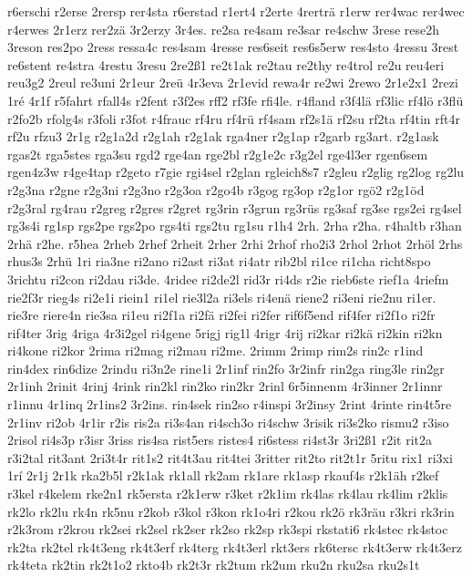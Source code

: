 {r6erschi
r2erse
2rersp
rer4sta
r6erstad
r1ert4
r2erte
4rerträ
r1erw
rer4wac
rer4wec
r4erwes
2r1erz
rer2zä
3r2erzy
3r4es.
re2sa
re4sam
re3sar
re4schw
3rese
rese2h
3reson
res2po
2ress
ressa4c
res4sam
4resse
res6seit
res6s5erw
res4sto
4ressu
3rest
re6stent
re4stra
4restu
3resu
2re2ß1
re2t1ak
re2tau
re2thy
re4trol
re2u
reu4eri
reu3g2
2reul
re3uni
2r1eur
2reü
4r3eva
2r1evid
rewa4r
re2wi
2rewo
2r1e2x1
2rezi
1ré
4r1f
r5fahrt
rfall4s
r2fent
r3f2es
rff2
rf3fe
rfi4le.
r4fland
r3f4lä
rf3lic
rf4lö
r3flü
r2fo2b
rfolg4s
r3foli
r3fot
r4frauc
rf4ru
rf4rü
rf4sam
rf2s1ä
rf2su
rf2ta
rf4tin
rft4r
rf2u
rfzu3
2r1g
r2g1a2d
r2g1ah
r2g1ak
rga4ner
r2g1ap
r2garb
rg3art.
r2g1ask
rgas2t
rga5stes
rga3su
rgd2
rge4an
rge2bl
r2g1e2c
r3g2el
rge4l3er
rgen6sem
rgen4z3w
r4ge4tap
r2geto
r7gie
rgi4sel
r2glan
rgleich8s7
r2gleu
r2glig
rg2log
rg2lu
r2g3na
r2gne
r2g3ni
r2g3no
r2g3oa
r2go4b
r3gog
rg3op
r2g1or
rgö2
r2g1öd
r2g3ral
rg4rau
r2greg
r2gres
r2gret
rg3rin
r3grun
rg3rüs
rg3saf
rg3se
rgs2ei
rg4sel
rg3s4i
rg1sp
rgs2pe
rgs2po
rgs4ti
rgs2tu
rg1su
r1h4
2rh.
2rha
r2ha.
r4haltb
r3han
2rhä
r2he.
r5hea
2rheb
2rhef
2rheit
2rher
2rhi
2rhof
rho2i3
2rhol
2rhot
2rhöl
2rhs
rhus3s
2rhü
1ri
ria3ne
ri2ano
ri2ast
ri3at
ri4atr
rib2bl
ri1ce
ri1cha
richt8spo
3richtu
ri2con
ri2dau
ri3de.
4ridee
ri2de2l
rid3r
ri4ds
r2ie
rieb6ste
rief1a
4riefm
rie2f3r
rieg4s
ri2e1i
riein1
ri1el
rie3l2a
ri3els
ri4enä
riene2
ri3eni
rie2nu
ri1er.
rie3re
riere4n
rie3sa
ri1eu
ri2f1a
ri2fä
ri2fei
ri2fer
rif6f5end
rif4fer
ri2f1o
ri2fr
rif4ter
3rig
4riga
4r3i2gel
ri4gene
5rigj
rig1l
4rigr
4rij
ri2kar
ri2kä
ri2kin
ri2kn
ri4kone
ri2kor
2rima
ri2mag
ri2mau
ri2me.
2rimm
2rimp
rim2s
rin2c
r1ind
rin4dex
rin6dize
2rindu
ri3n2e
rine1i
2r1inf
rin2fo
3r2infr
rin2ga
ring3le
rin2gr
2r1inh
2rinit
4rinj
4rink
rin2kl
rin2ko
rin2kr
2rinl
6r5innenm
4r3inner
2r1innr
r1innu
4r1inq
2r1ins2
3r2ins.
rin4sek
rin2so
r4inspi
3r2insy
2rint
4rinte
rin4t5re
2r1inv
ri2ob
4r1ir
r2is
ris2a
ri3s4an
ri4sch3o
ri4schw
3risik
ri3s2ko
rismu2
r3iso
2risol
ri4s3p
r3isr
3riss
ris4sa
rist5ers
ristes4
ri6stess
ri4st3r
3ri2ß1
r2it
rit2a
r3i2tal
rit3ant
2ri3t4r
rit1s2
rit4t3au
rit4tei
3ritter
rit2to
rit2t1r
5ritu
rix1
ri3xi
1rí
2r1j
2r1k
rka2b5l
r2k1ak
rk1all
rk2am
rk1are
rk1asp
rkauf4s
r2k1äh
r2kef
r3kel
r4kelem
rke2n1
rk5ersta
r2k1erw
r3ket
r2k1im
rk4las
rk4lau
rk4lim
r2klis
rk2lo
rk2lu
rk4n
rk5nu
r2kob
r3kol
r3kon
rk1o4ri
r2kou
rk2ö
rk3räu
r3kri
rk3rin
r2k3rom
r2krou
rk2sei
rk2sel
rk2ser
rk2so
rk2sp
rk3spi
rkstati6
rk4stec
rk4stoc
rk2ta
rk2tel
rk4t3eng
rk4t3erf
rk4terg
rk4t3erl
rkt3ers
rk6tersc
rk4t3erw
rk4t3erz
rk4teta
rk2tin
rk2t1o2
rkto4b
rk2t3r
rk2tum
rk2um
rku2n
rku2sa
rku2s1t
}

